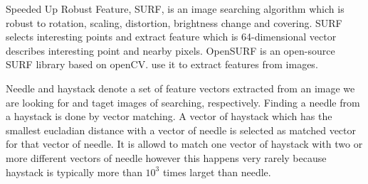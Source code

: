 

Speeded Up Robust Feature, SURF\cite{surf}, is an image searching algorithm which is robust to rotation, scaling, distortion, brightness change and covering.
SURF selects interesting points and extract feature which is 64-dimensional vector describes interesting point and nearby pixels.
OpenSURF\cite{opensurf} is an open-source SURF library based on openCV\cite{opencv}.
\name{} use it to extract features from images.

Needle and haystack denote a set of feature vectors extracted from an image we are looking for and taget images of searching, respectively.
Finding a needle from a haystack is done by vector matching.
A vector of haystack which has the smallest eucladian distance with a vector of needle is selected as matched vector for that vector of needle.
It is allowd to match one vector of haystack with two or more different vectors of needle however this happens very rarely because haystack is typically more than $10^3$ times larget than needle.

